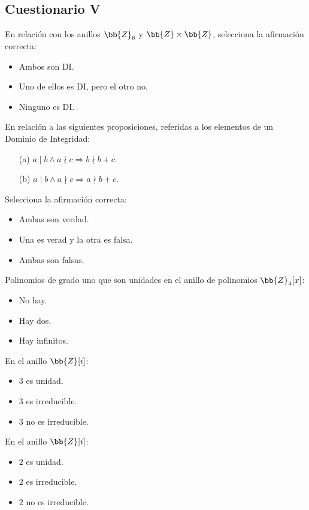\subsection{Cuestionario V}

\begin{ejercicio}
    En relación con los anillos $\bb{Z}_6$ y $\bb{Z} \times \bb{Z}$, selecciona la afirmación correcta:
    \begin{itemize}
        \item Ambos son DI.
        \item Uno de ellos es DI, pero el otro no.
        \item Ninguno es DI.
    \end{itemize}
\end{ejercicio}

\begin{ejercicio}
    En relación a las siguientes proposiciones, referidas a los elementos de un Dominio de Integridad:
    \begin{enumerate}
        \item [(a)] $a\mid b \land a \nmid c \Rightarrow b \nmid b+c$.
        \item [(b)] $a\mid b \land a \nmid c \Rightarrow a \nmid b+c$.
    \end{enumerate}
    Selecciona la afirmación correcta:
    \begin{itemize}
        \item Ambas son verdad.
        \item Una es verad y la otra es falsa.
        \item Ambas son falsas.
    \end{itemize}
\end{ejercicio}

\begin{ejercicio}
    Polinomios de grado uno que son unidades en el anillo de polinomios $\bb{Z}_4[x]$:
    \begin{itemize}
        \item No hay.
        \item Hay dos.
        \item Hay infinitos.
    \end{itemize}
\end{ejercicio}

\begin{ejercicio}
    En el anillo $\bb{Z}[i]$:
    \begin{itemize}
        \item $3$ es unidad.
        \item $3$ es irreducible.
        \item $3$ no es irreducible.
    \end{itemize}
\end{ejercicio}

\begin{ejercicio}
    En el anillo $\bb{Z}[i]$:
    \begin{itemize}
        \item $2$ es unidad.
        \item $2$ es irreducible.
        \item $2$ no es irreducible.
    \end{itemize}
\end{ejercicio}

\newpage
\resetearcontador
